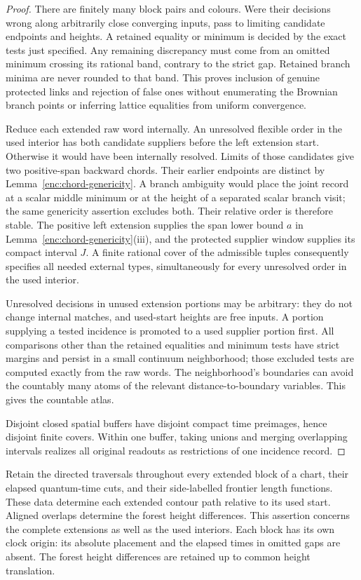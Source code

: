 \begin{proof}
There are finitely many block pairs and colours.  Were their
decisions wrong along arbitrarily close converging inputs, pass
to limiting candidate endpoints and heights.  A retained equality
or minimum is decided by the exact tests just specified.  Any
remaining discrepancy must come from an omitted minimum crossing
its rational band, contrary to the strict gap.  Retained branch
minima are never rounded to that band.  This proves inclusion of
genuine protected links and rejection of false ones without
enumerating the Brownian branch points or inferring lattice
equalities from uniform convergence.

Reduce each extended raw word internally.  An unresolved flexible
order in the used interior has both candidate suppliers before the
left extension start.  Otherwise it would have been internally
resolved.  Limits of those candidates give two positive-span backward
chords.  Their earlier endpoints are distinct by
Lemma~\ref{enc:chord-genericity}.  A branch ambiguity would place the joint
record at a scalar middle minimum or at the height of a separated
scalar branch visit; the same genericity assertion excludes both.
Their relative order is therefore stable.  The positive left
extension supplies the span lower bound $a$ in
Lemma~\ref{enc:chord-genericity}(iii), and the protected supplier
window supplies its compact interval $J$.  A finite rational cover
of the admissible tuples consequently specifies all needed external
types, simultaneously for every unresolved order in the used interior.

Unresolved decisions in unused extension portions may be arbitrary:
they do not change internal matches, and used-start heights are free
inputs.  A portion supplying a tested incidence is promoted to a used
supplier portion first.  All comparisons other than the retained
equalities and minimum tests have strict margins and persist in a
small continuum neighborhood; those excluded tests are computed
exactly from the raw words.  The neighborhood's boundaries can avoid the countably many atoms
of the relevant distance-to-boundary variables.  This gives the
countable atlas.

Disjoint closed spatial buffers have disjoint compact time preimages,
hence disjoint finite covers.  Within one buffer, taking unions and
merging overlapping intervals realizes all original readouts as
restrictions of one incidence record.
\end{proof}

\begin{lemma}
\label{ker:input-recovery}
Retain the directed traversals throughout every extended block of a
chart, their elapsed quantum-time cuts, and their side-labelled
frontier length functions.  These data determine each extended
contour path relative to its used start.  Aligned overlaps determine
the forest height differences.  This assertion concerns the complete
extensions as well as the used interiors.  Each block has its own
clock origin: its absolute placement and the elapsed times in omitted
gaps are absent.  The forest height differences are retained up to
common height translation.
\end{lemma}

